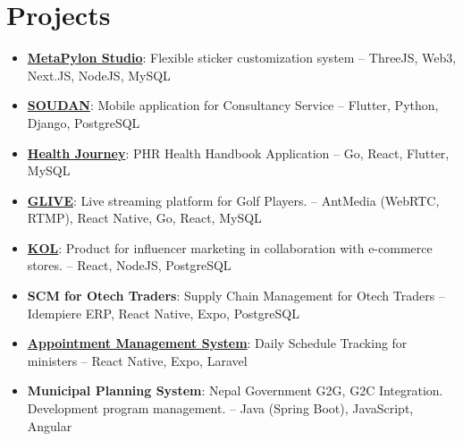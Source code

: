 \documentclass[letterpaper,11pt]{article}
\newcommand{\resumeSubItem}[2]{\item\small{
		{\textbf{#1}}{: #2 \vspace{-2pt}}
	}\vspace{-4pt}}
\newcommand{\resumeSubHeadingListStart}{\begin{itemize}[leftmargin=*]}
\newcommand{\resumeSubHeadingListEnd}{\end{itemize}}
\begin{document}
	\section{Projects}
	\resumeSubHeadingListStart
	\resumeSubItem{\href{https://metapylon.io}{MetaPylon Studio}}
	{Flexible sticker customization system -- ThreeJS, Web3, Next.JS, NodeJS, MySQL}
	\resumeSubItem{\href{https://play.google.com/store/apps/details?id=com.ito_technologies.soudan&hl=en&gl=US&pli=1}{SOUDAN}}
	{Mobile application for Consultancy Service -- Flutter, Python, Django, PostgreSQL}
	\resumeSubItem{\href{https://health-journey.jp/}{Health Journey}}
	{PHR Health Handbook Application -- Go, React, Flutter, MySQL}
	\resumeSubItem{\href{https://www.glive-official.co.jp/}{GLIVE}}
	{Live streaming platform for Golf Players. -- AntMedia (WebRTC, RTMP), React Native, Go, React, MySQL}
	\resumeSubItem{\href{https://kol-tech.co.jp/}{KOL}}
	{Product for influencer marketing in collaboration with e-commerce stores. -- React, NodeJS, PostgreSQL}
	\resumeSubItem{SCM for Otech Traders}
	{Supply Chain Management for Otech Traders -- Idempiere ERP, React Native, Expo, PostgreSQL}
	\resumeSubItem{\href{https://play.google.com/store/apps/details?id=com.phoenix.tourism_ministry.appointment&hl=en_us}{Appointment Management System}}
	{Daily Schedule Tracking for ministers -- React Native, Expo, Laravel}
	\resumeSubItem{Municipal Planning System}
	{Nepal Government G2G, G2C Integration. Development program management. -- Java (Spring Boot), JavaScript, Angular}
	\resumeSubHeadingListEnd
	
	
	
\end{document}

